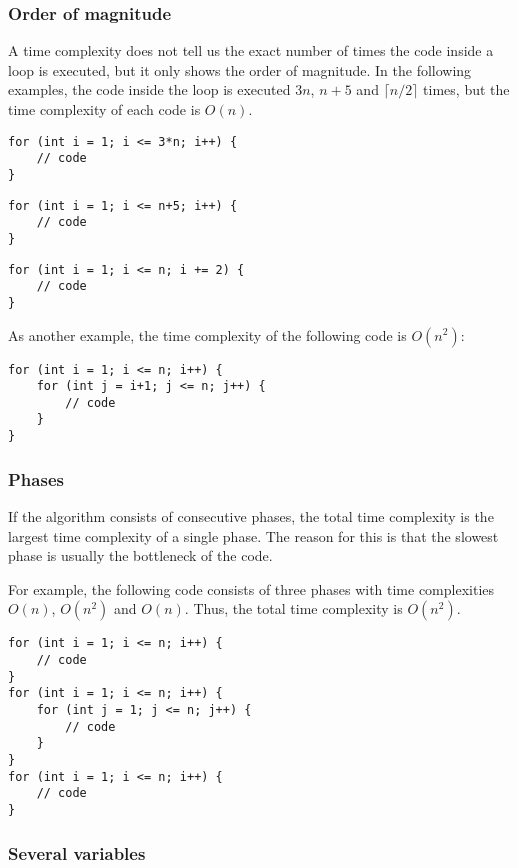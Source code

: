 \subsubsection*{Order of magnitude}

A time complexity does not tell us the exact number
of times the code inside a loop is executed,
but it only shows the order of magnitude.
In the following examples, the code inside the loop
is executed $3n$, $n+5$ and $\lceil n/2 \rceil$ times,
but the time complexity of each code is $O(n)$.

\begin{lstlisting}
for (int i = 1; i <= 3*n; i++) {
    // code
}
\end{lstlisting}

\begin{lstlisting}
for (int i = 1; i <= n+5; i++) {
    // code
}
\end{lstlisting}

\begin{lstlisting}
for (int i = 1; i <= n; i += 2) {
    // code
}
\end{lstlisting}

As another example,
the time complexity of the following code is $O(n^2)$:

\begin{lstlisting}
for (int i = 1; i <= n; i++) {
    for (int j = i+1; j <= n; j++) {
        // code
    }
}
\end{lstlisting}

\subsubsection*{Phases}

If the algorithm consists of consecutive phases,
the total time complexity is the largest
time complexity of a single phase.
The reason for this is that the slowest
phase is usually the bottleneck of the code.

For example, the following code consists
of three phases with time complexities
$O(n)$, $O(n^2)$ and $O(n)$.
Thus, the total time complexity is $O(n^2)$.

\begin{lstlisting}
for (int i = 1; i <= n; i++) {
    // code
}
for (int i = 1; i <= n; i++) {
    for (int j = 1; j <= n; j++) {
        // code
    }
}
for (int i = 1; i <= n; i++) {
    // code
}
\end{lstlisting}

\subsubsection*{Several variables}

